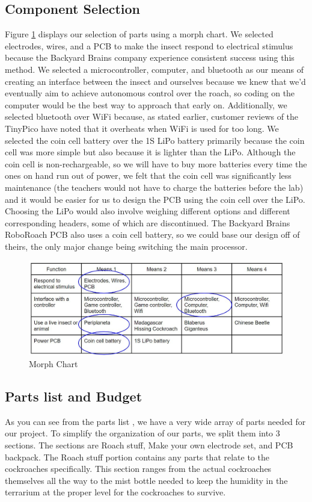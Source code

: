 \documentclass{article}
\begin{document}
\subsection{Component Selection}
\par Figure \ref{fig:morph} displays our selection of parts using a morph chart. We selected electrodes, wires, and a PCB to make the insect respond to electrical stimulus because the Backyard Brains company experience consistent success using this method. We selected a microcontroller, computer, and bluetooth as our means of creating an interface between the insect and ourselves because we knew that we'd eventually aim to achieve autonomous control over the roach, so coding on the computer would be the best way to approach that early on. Additionally, we selected bluetooth over WiFi because, as stated earlier, customer reviews of the TinyPico have noted that it overheats when WiFi is used for too long. We selected the coin cell battery over the 1S LiPo battery primarily because the coin cell was more simple but also because it is lighter than the LiPo. Although the coin cell is non-rechargeable, so we will have to buy more batteries every time the ones on hand run out of power, we felt that the coin cell was significantly less maintenance (the teachers would not have to charge the batteries before the lab) and it would be easier for us to design the PCB using the coin cell over the LiPo. Choosing the LiPo would also involve weighing different options and different corresponding headers, some of which are discontinued. The Backyard Brains RoboRoach PCB also uses a coin cell battery, so we could base our design off of theirs, the only major change being switching the main processor.

\begin{figure}[ht!]
\centering
\includegraphics[scale=0.4]{morph.JPG}
\caption{Morph Chart}
\label{fig:morph}
\end{figure}

\subsection{Parts list and Budget}
As you can see from the parts list , we have a very wide array of parts needed for our project. To simplify the organization of our parts, we split them into 3 sections. The sections are Roach stuff, Make your own electrode set, and PCB backpack. The Roach stuff portion contains any parts that relate to the cockroaches specifically. This section ranges from the actual cockroaches themselves all the way to the mist bottle needed to keep the humidity in the terrarium at the proper level for the cockroaches to survive.
\end{document}
